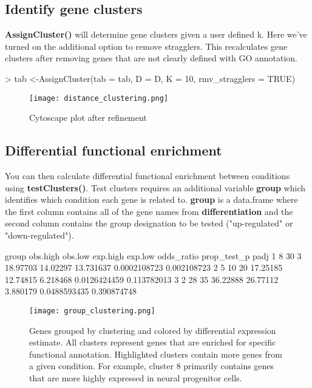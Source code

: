 \documentclass{article}
\begin{document}
\subsection*{Identify gene clusters}
\textbf{AssignCluster()} will determine gene clusters given a user defined k. Here we've turned on the additional option to remove stragglers. This recalculates gene clusters after removing genes that are not clearly defined with GO annotation.
\vspace{5mm}
\begin{Schunk}
\begin{Sinput}
> tab <-AssignCluster(tab = tab, D = D, K = 10, rmv_stragglers = TRUE)
\end{Sinput}
\end{Schunk}
\begin{figure}[ht]
\texttt{[image: distance\_clustering.png]}
\centering
\caption{Cytoscape plot after refinement}
\end{figure}

\subsection*{Differential functional enrichment}
You can then calculate differential functional enrichment between conditions using \textbf{testClusters()}. Test clusters requires an additional variable \textbf{group} which identifies which condition each gene is related to. \textbf{group} is a data.frame where the first column contains all of the gene names from \textbf{differentiation} and the second column contains the group designation to be tested ("up-regulated" or "down-regulated").

\begin{Schunk}
\begin{Soutput}
  group obs.high obs.low exp.high  exp.low odds_ratio  prop_test_p        padj
1     8       30       3 18.97703 14.02297  13.731637 0.0002108723 0.002108723
2     5       10      20 17.25185 12.74815   6.218468 0.0126424459 0.113782013
3     2       28      35 36.22888 26.77112   3.880179 0.0488593435 0.390874748
\end{Soutput}
\end{Schunk}
\begin{figure}[ht]
\texttt{[image: group\_clustering.png]}
\centering
\caption{Genes grouped by clustering and colored by differential expression estimate. All clusters represent genes that are enriched for specific functional annotation. Highlighted clusters contain more genes from a given condition. For example, cluster 8 primarily contains genes that are more highly expressed in neural progenitor cells.}
\end{figure}
\end{document}
